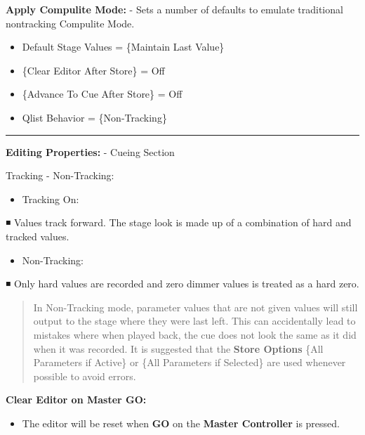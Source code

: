 \documentclass[
]{article}
\providecommand{\tightlist}{%
  \setlength{\itemsep}{0pt}\setlength{\parskip}{0pt}}
\begin{document}
\textbf{Apply Compulite Mode:} - Sets a number of defaults to emulate traditional nontracking Compulite Mode.

\begin{itemize}
\item
  Default Stage Values = \{Maintain Last Value\}
\item
  \{Clear Editor After Store\} = Off
\item
  {\{Advance To Cue After Store\} = Off}
\item
  Qlist Behavior = \{Non-Tracking\}
\end{itemize}

\begin{center}\rule{0.5\linewidth}{0.5pt}\end{center}

\textbf{Editing Properties:} - Cueing Section

Tracking - Non-Tracking:

\begin{itemize}
\tightlist
\item
  Tracking On:
\end{itemize}

◾ Values track forward. The stage look is made up of a combination of hard and tracked values.

\begin{itemize}
\tightlist
\item
  Non-Tracking:
\end{itemize}

◾ Only hard values are recorded and zero dimmer values is treated as a hard zero.

\begin{quote}
{In Non-Tracking mode, parameter values that are not given values will still output to the stage where they were last left. This can accidentally lead to mistakes where when played back, the cue does not look the same as it did when it was recorded. It is suggested that the \textbf{Store Options} \{All Parameters if Active\} or \{All Parameters if Selected\} are used whenever possible to avoid errors.}
\end{quote}

\textbf{Clear Editor on Master GO:}

\begin{itemize}
\tightlist
\item
  The editor will be reset when \textbf{GO} on the \textbf{Master Controller} is pressed.
\end{itemize}
\end{document}
